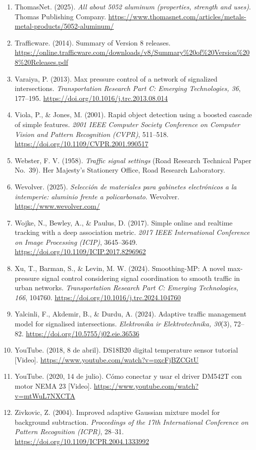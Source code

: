 \begin{enumerate}
\item
  ThomasNet. (2025). \emph{All about 5052 aluminum (properties, strength and uses)}. Thomas Publishing Company. \url{https://www.thomasnet.com/articles/metals-metal-products/5052-aluminum/}
\item
  Trafficware. (2014). Summary of Version 8 releases. \url{https://online.trafficware.com/downloads/v8/Summary%20of%20Version%208%20Releases.pdf}
\item
  Varaiya, P. (2013). Max pressure control of a network of signalized intersections. \emph{Transportation Research Part C: Emerging Technologies, 36}, 177--195. \url{https://doi.org/10.1016/j.trc.2013.08.014}
\item
  Viola, P., \& Jones, M. (2001). Rapid object detection using a boosted cascade of simple features. \emph{2001 IEEE Computer Society Conference on Computer Vision and Pattern Recognition (CVPR)}, 511--518. \url{https://doi.org/10.1109/CVPR.2001.990517}
\item
  Webster, F. V. (1958). \emph{Traffic signal settings} (Road Research Technical Paper No.~39). Her Majesty's Stationery Office, Road Research Laboratory.
\item
  Wevolver. (2025). \emph{Selección de materiales para gabinetes electrónicos a la intemperie: aluminio frente a policarbonato}. Wevolver. \url{https://www.wevolver.com/}
\item
  Wojke, N., Bewley, A., \& Paulus, D. (2017). Simple online and realtime tracking with a deep association metric. \emph{2017 IEEE International Conference on Image Processing (ICIP)}, 3645--3649. \url{https://doi.org/10.1109/ICIP.2017.8296962}
\item
  Xu, T., Barman, S., \& Levin, M. W. (2024). Smoothing-MP: A novel max-pressure signal control considering signal coordination to smooth traffic in urban networks. \emph{Transportation Research Part C: Emerging Technologies, 166}, 104760. \url{https://doi.org/10.1016/j.trc.2024.104760}
\item
  Yalcinli, F., Akdemir, B., \& Durdu, A. (2024). Adaptive traffic management model for signalised intersections. \emph{Elektronika ir Elektrotechnika, 30}(3), 72--82. \url{https://doi.org/10.5755/j02.eie.36536}
\item
  YouTube. (2018, 8 de abril). DS18B20 digital temperature sensor tutorial {[}Video{]}. \url{https://www.youtube.com/watch?v=pxcFjBZCGtU}
\item
  YouTube. (2020, 14 de julio). Cómo conectar y usar el driver DM542T con motor NEMA 23 {[}Video{]}. \url{https://www.youtube.com/watch?v=mtWuL7NXCTA}
\item
  Zivkovic, Z. (2004). Improved adaptive Gaussian mixture model for background subtraction. \emph{Proceedings of the 17th International Conference on Pattern Recognition (ICPR)}, 28--31. \url{https://doi.org/10.1109/ICPR.2004.1333992}
\end{enumerate}
